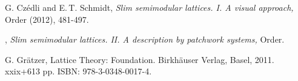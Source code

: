 \documentclass{amsart}
\theoremstyle{plain}
\theoremstyle{definition}
\begin{document}
\begin{thebibliography}{9}

G. Cz\'edli and E.\,T. Schmidt, 
\emph{Slim semimodular lattices. I. A visual approach,}
Order  (2012), 481-497.

\bysame, 
\emph{Slim semimodular lattices. II. 
A description by patchwork systems,} 
Order.

G. Gr\"atzer,
Lattice Theory: Foundation. 
Birkh\"auser Verlag, Basel, 2011. xxix+613 pp. ISBN: 978-3-0348-0017-4.

\end{thebibliography}
\end{document}
